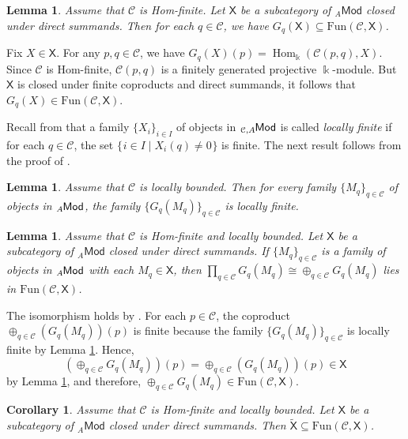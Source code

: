 \documentclass{amsart}
\theoremstyle{bfupright head,slanted body}
\theoremstyle{bfupright head,upright body}
\theoremstyle{fixed bf head,slanted body}
\newtheorem{cor}[res]{Corollary}        \newtheorem*{cor*}{Corollary}
\newtheorem{lem}[res]{Lemma}            \newtheorem*{lem*}{Lemma}
\theoremstyle{fixed bf head,upright body}
\theoremstyle{numbered paragraph}
\newenvironment{prf*}[1][Proof]{%
	\begin{proof}[\bf #1]
		\setcounter{equation}{0}
		\renewcommand{\theequation}{\arabic{equation}}}
	{\end{proof}
}
\numberwithin{equation}{res}
\newcommand{\setof}[3][\mspace{1mu}]{\{#1#2 \mid #3#1\}}
\newcommand{\Mod}[1]{{_{#1}\mathsf{Mod}}}
\newcommand{\Hom}[3][]{\operatorname{Hom}_{#1}(#2,#3)}
\newcommand{\Fun}{\mathrm{Fun}}
\newcommand{\X}{\mathsf{X}}
\newcommand{\C}{\mathcal{C}}
\newcommand{\kk}{\Bbbk}
\newcommand{\is}{\cong}
\newcommand{\lMod}[1]{{}_{#1}\mspace{-1mu}{\sf{Mod}}}
\begin{document}
\begin{lem}\label{preserve}
Assume that $\C$ is Hom-finite. Let $\X$ be a subcategory of $\Mod{A}$ closed under direct summands. Then for each $q\in\C$, we have ${G_q(\X)}\subseteq\Fun(\C,\X)$.
\end{lem}

\begin{prf*}
Fix $X\in \X$. For any $p,q\in \C$, we have $G_{q}(X)(p)=\Hom[\kk]{\C(p,q)}{X}$.
Since $\C$ is Hom-finite, $\C(p,q)$ is a finitely generated projective $\kk$-module.
But $\X$ is closed under finite coproducts and direct summands, it follows that $G_{q}(X)\in\Fun(\C,\X)$.
\end{prf*}

Recall from \cite[Definition 3.5]{HJ23} that a family $\{X_i\}_{i\in I}$ of objects in $\lMod{\C,A}$ is called \emph{locally finite} if for each $q\in\C$, the set $\setof{i\in I}{X_i(q)\neq 0}$ is finite. The next result follows from the proof of \cite[Proposition 3.7]{HJ23}.

\begin{lem}\label{locally finite}
Assume that $\C$ is locally bounded. Then for every family $\{M_q\}_{q\in\C}$ of objects in $\lMod{A}$, the family $\{G_q(M_q)\}_{q\in\C}$ is locally finite.
\end{lem}

\begin{lem}\label{coproduct}
Assume that $\C$ is Hom-finite and locally bounded. Let $\X$ be a subcategory of $\Mod{A}$ closed under direct summands. If $\{M_q\}_{q\in\C}$ is a family of objects in $\lMod{A}$ with each $M_q\in\X$, then $\prod_{q\in\C} G_q(M_q)\is\oplus_{q\in\C} G_q(M_q)$ lies in $\Fun(\C,\X)$.
\end{lem}

\begin{prf*}
The isomorphism holds by \cite[Proposition 3.7]{HJ23}.
For each $p\in\C$, the coproduct $\oplus_{q\in\C} (G_q(M_q))(p)$ is finite because the family $\{G_q(M_q)\}_{q\in\C}$ is locally finite by Lemma \ref{locally finite}.
Hence,
\[(\oplus_{q\in\C} G_q(M_q))(p) = \oplus_{q\in\C} (G_q(M_q))(p)\in\X\]
by Lemma \ref{preserve}, and therefore, $\oplus_{q\in\C} G_q(M_q) \in \Fun(\C,\X)$.
\end{prf*}

\begin{cor}\label{tilder}
Assume that $\C$ is Hom-finite and locally bounded. Let $\X$ be a subcategory of $\Mod{A}$ closed under direct summands. Then $\widetilde{\X}\subseteq\Fun(\C,\X)$.
\end{cor}
\end{document}
